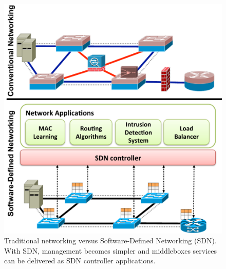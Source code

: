 \begin{figure}[t!]
\centering
\includegraphics[width=0.95\columnwidth]{figures/fig4_traditional_and_sdn.pdf}
\caption{Traditional networking versus Software-Defined Networking (SDN). With SDN, management becomes simpler and middleboxes services can be delivered as SDN controller applications.}
\label{fig:traditionalversusSDN}
\end{figure}

